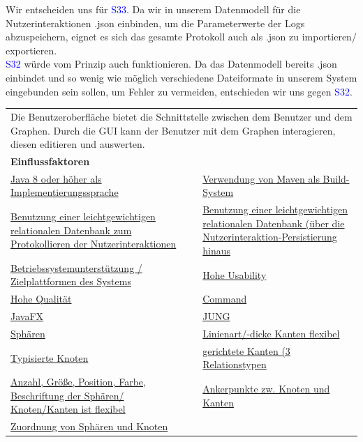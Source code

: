 \documentclass[enabledeprecatedfontcommands,fontsize=11pt,paper=a4,twoside]{scrartcl}
\newcounter{one}
\newcommand{\cb}[1]{{\textcolor{blue}{#1}}}
\begin{document}
	\begin{onehalfspace}
		Wir entscheiden uns für \cb{S33}. Da wir in unserem Datenmodell für die Nutzerinteraktionen .json einbinden, um die Parameterwerte der Logs abzuspeichern, eignet es sich das gesamte Protokoll auch als .json zu importieren/ exportieren. \\
		\cb{S32} würde vom Prinzip auch funktionieren. Da das Datenmodell bereits .json einbindet und so wenig wie möglich verschiedene Dateiformate in unserem System eingebunden sein sollen, um Fehler zu vermeiden, entschieden wir uns gegen \cb{S32}.
	\end{onehalfspace}
	\newpage
	\begin{tabular} {|p{8cm} p{8cm}|}
		\hline
		\rowcolor{prob}\multicolumn{2}{|l|}{\parbox{16cm}{\textbf{13: Benutzeroberfläche}}} \\  \hline\hline 
		\multicolumn{2}{|l|}{\parbox{16cm}{Die Benutzeroberfläche bietet die Schnittstelle zwischen dem Benutzer und dem Graphen. Durch die GUI kann der Benutzer mit dem Graphen interagieren, diesen editieren und auswerten.}}\rule{0pt}{4ex}\\ [1ex] \hline
		\multicolumn{2}{|l|}{\textbf{Einflussfaktoren}}\\
		\hyperlink{b}{Java 8 oder höher als Implementierungssprache} &
		\hyperlink {c}{Verwendung von Maven als Build-System} \\
		\hyperlink {d}{Benutzung einer leichtgewichtigen relationalen Datenbank zum Protokollieren der Nutzerinteraktionen}&
		\hyperlink {e}{Benutzung einer leichtgewichtigen relationalen Datenbank (über die Nutzerinteraktion-Persistierung hinaus}\\
		\hyperlink {f}{Betriebssystemunterstützung / Zielplattformen des Systems}&
		\hyperlink {g}{Hohe Usability}\\
		\hyperlink {h}{Hohe Qualität}&
		\hyperlink {i}{Command} \\
		\hyperlink {j}{JavaFX}&
		\hyperlink {k}{JUNG} \\
		\hyperlink {n}{Sphären} &
		\hyperlink {o}{Linienart/-dicke Kanten flexibel}\\
		\hyperlink {p}{Typisierte Knoten} &
		\hyperlink {q}{gerichtete Kanten (3 Relationstypen} \\
		\hyperlink {r}{Anzahl, Größe, Position, Farbe, Beschriftung der Sphären/ Knoten/Kanten ist flexibel} &
		\hyperlink {s}{Ankerpunkte zw. Knoten und Kanten} \\
		\hyperlink {t}{Zuordnung von Sphären und Knoten} &

\end{tabular}
\end{document}
